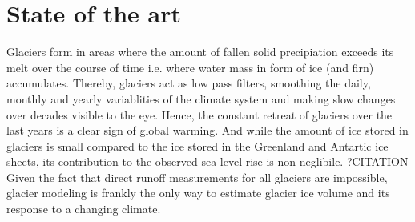 \documentclass[12pt, a4paper, abstract=off, oneside]{scrartcl}
\begin{document}


        

    

    \section{State of the art} %
    \label{sec:state_of_the_art}

        
        Glaciers form in areas where the amount of fallen solid precipiation exceeds its melt over the course of time i.e. where water mass in form of ice (and firn) accumulates. Thereby, glaciers act as low pass filters, smoothing the daily, monthly and yearly variablities of the climate system and making slow changes over decades visible to the eye. Hence, the constant retreat of glaciers over the last years is a clear sign of global warming. And while the amount of ice stored in glaciers is small compared to the ice stored in the Greenland and Antartic ice sheets, its contribution to the observed sea level rise is non neglibile. ?CITATION
        Given the fact that direct runoff measurements for all glaciers are impossible, glacier modeling is frankly the only way to estimate glacier ice volume and its response to a changing climate. 
\end{document}

